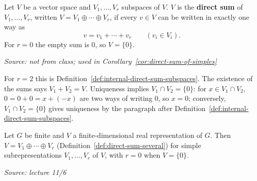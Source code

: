 \documentclass[11pt]{report}
\newcommand{\srcline}[1]{\par\hfill{\footnotesize\textit{Source: #1}}}
\begin{document}
\begin{defbox}\label{def:direct-sum-several}
Let $V$ be a vector space and $V_1, \ldots, V_r$ subspaces of $V$. $V$ is the \textbf{direct sum} of $V_1, \ldots, V_r$, written $V = V_1 \oplus \cdots \oplus V_r$, if every $v \in V$ can be written in exactly one way as
\[ v = v_1 + \cdots + v_r \qquad (v_i \in V_i). \]
For $r = 0$ the empty sum is $0$, so $V = \{0\}$.
\srcline{not from class; used in Corollary~\ref{cor:direct-sum-of-simples}}
\end{defbox}

For $r = 2$ this is Definition~\ref{def:internal-direct-sum-subspaces}. The existence of the sums says $V_1 + V_2 = V$. Uniqueness implies $V_1 \cap V_2 = \{0\}$: for $x \in V_1 \cap V_2$, $0 = 0 + 0 = x + (-x)$ are two ways of writing $0$, so $x = 0$; conversely, $V_1 \cap V_2 = \{0\}$ gives uniqueness by the paragraph after Definition~\ref{def:internal-direct-sum-subspaces}.

\begin{corbox}\label{cor:direct-sum-of-simples}
Let $G$ be finite and $V$ a finite-dimensional real representation of $G$. Then $V = V_1 \oplus \cdots \oplus V_r$ (Definition~\ref{def:direct-sum-several}) for simple subrepresentations $V_1, \ldots, V_r$ of $V$, with $r = 0$ when $V = \{0\}$.
\srcline{lecture 11/6}
\end{corbox}
\end{document}

